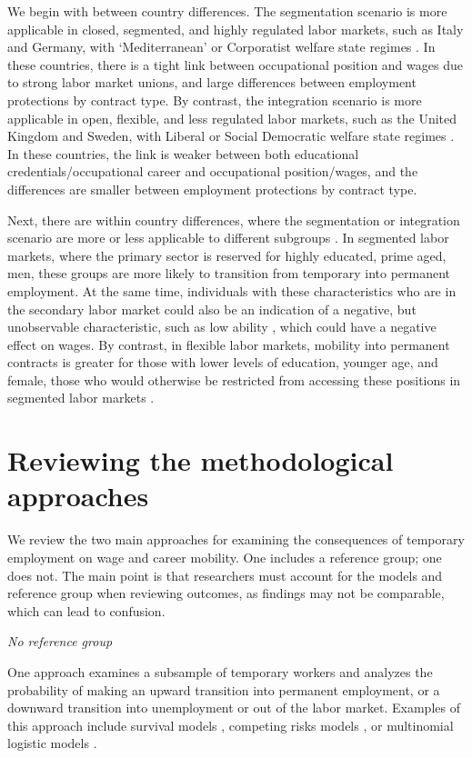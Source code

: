 \documentclass[12pt]{article}
\begin{document}
We begin with between country differences.  The segmentation scenario is more applicable in closed, segmented, and highly regulated labor markets, such as Italy and Germany, with `Mediterranean' or Corporatist welfare state regimes \citep{barbieri_2009}.  In these countries, there is a tight link between occupational position and wages due to strong labor market unions, and large differences between employment protections by contract type.  By contrast, the integration scenario is more applicable in open, flexible, and less regulated labor markets, such as the United Kingdom and Sweden, with Liberal or Social Democratic welfare state regimes \citep{muffels_luijkx_2008}.  In these countries, the link is weaker between both educational credentials/occupational career and occupational position/wages, and the differences are smaller between employment protections by contract type.  

Next, there are within country differences, where the segmentation or integration scenario are more or less applicable to different subgroups \citep{gebel_2010}.  In segmented labor markets, where the primary sector is reserved for highly educated, prime aged, men, these groups are more likely to transition from temporary into permanent employment.  At the same time, individuals with these characteristics who are in the secondary labor market could also be an indication of a negative, but unobservable characteristic, such as low ability \citep{booth_etal_2002}, which could have a negative effect on wages.  By contrast, in flexible labor markets, mobility into permanent contracts is greater for those with lower levels of education, younger age, and female, those who would otherwise be restricted from accessing these positions in segmented labor markets \citep{kalleberg_2001}.  

\section{Reviewing the methodological approaches}

We review the two main approaches for examining the consequences of temporary employment on wage and career mobility.  One includes a reference group; one does not.  The main point is that researchers must account for the models and reference group when reviewing outcomes, as findings may not be comparable, which can lead to confusion.

\emph{No reference group}

One approach examines a subsample of temporary workers and analyzes the probability of making an upward transition into permanent employment, or a downward transition into unemployment or out of the labor market.  Examples of this approach include survival models \citep{gebel_2009}, competing risks models \citep{reichelt_2015}, or multinomial logistic models \citep{passaretta_wolbers_2019}.
\end{document}
